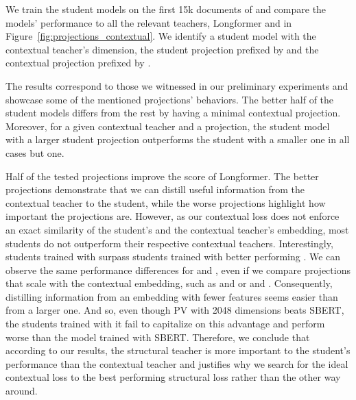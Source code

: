 We train the student models on the first 15k documents of 
and compare the models' performance to all the relevant teachers, Longformer
and  in Figure~\ref{fig:projections_contextual}.
We identify a student model with the contextual teacher's dimension, the
student projection prefixed by  and the contextual projection
prefixed by .

The results correspond to those we witnessed in our preliminary experiments and
showcase some of the mentioned projections' behaviors. The better half of the
student models differs from the rest by having a minimal contextual projection.
Moreover, for a given contextual teacher and a projection, the student model
with a larger student projection outperforms the student with a smaller one in
all cases but one.

Half of the tested projections improve the score of Longformer. The better
projections demonstrate that we can distill useful information from the
contextual teacher to the student, while the worse projections highlight how
important the projections are. However, as our contextual loss does not enforce
an exact similarity of the student's and the contextual teacher's embedding,
most students do not outperform their respective contextual teachers.
Interestingly, students trained with  surpass students trained
with better performing . We can observe the same performance
differences for  and , even if we compare
projections that scale with the contextual embedding, such as
 and  or
 and . Consequently,
distilling information from an embedding with fewer features seems easier than
from a larger one. And so, even though PV with 2048 dimensions beats SBERT, the
students trained with it fail to capitalize on this advantage and perform worse
than the model trained with SBERT. Therefore, we conclude that according to our
results, the structural teacher is more important to the student's performance
than the contextual teacher and justifies why we search for the ideal
contextual loss to the best performing structural loss rather than the other
way around.

